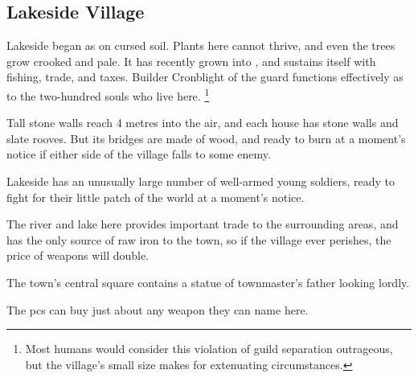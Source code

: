 

\subsection{Lakeside Village}
\label{lakeside}


Lakeside began as  on cursed soil.
Plants here cannot thrive, and even the trees grow crooked and pale.
It has recently grown into , and sustains itself with fishing, trade, and taxes.
Builder Cronblight of the \gls{guard} functions effectively as  to the two-hundred souls who live here.%
\footnote{Most humans would consider this violation of guild separation outrageous, but the \gls{village}'s small size makes for extenuating circumstances.}

Tall stone walls reach 4 metres into the air, and each house has stone walls and slate rooves.
But its bridges are made of wood, and ready to burn at a moment's notice if either side of the \gls{village} falls to some enemy.

Lakeside has an unusually large number of well-armed young soldiers, ready to fight for their little patch of the world at a moment's notice.

The river and lake here provides important trade to the surrounding areas, and has the only source of raw iron to the town, so if the \gls{village} ever perishes, the price of weapons will double.


The town's central square contains a statue of \gls{townmaster}'s father looking lordly.


The \glspl{pc} can buy just about any weapon they can name here.

